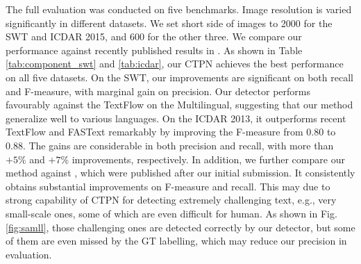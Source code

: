 \documentclass[runningheads]{llncs}
\begin{document}
 
The full evaluation was conducted on five benchmarks. Image resolution  is varied significantly in different datasets. We set short side of images to 2000 for the SWT and ICDAR 2015, and 600 for the other three. We compare our performance against recently published results in \cite{Busta2015,Tian2015,Zhang2015}. As shown in Table \ref{tab:component_swt} and \ref{tab:icdar}, our CTPN achieves the best performance on all five datasets. On the SWT, our improvements  are  significant on both recall and F-measure, with  marginal gain on precision. Our detector performs favourably against the TextFlow on the Multilingual, suggesting that our method generalize well to various languages. On the  ICDAR 2013, it outperforms recent TextFlow \cite{Tian2015} and FASText \cite{Busta2015} remarkably by improving the F-measure from 0.80 to 0.88. The gains are considerable in both precision and recall, with more than $+5\%$ and $+7\%$ improvements, respectively. 
 In addition, we further compare our method against \cite{Gupta2016,He2016,Zhang2016}, which were published after our initial submission. It consistently obtains substantial  improvements on F-measure and recall. 
 This may due to  strong capability of  CTPN for detecting extremely challenging text, e.g., very small-scale ones,  some of which are even difficult for human.  As shown in Fig. \ref{fig:samll}, those challenging ones are detected correctly by our detector, but some of them  are even missed by the GT labelling, which may reduce our precision in evaluation.     

 







\end{document}
